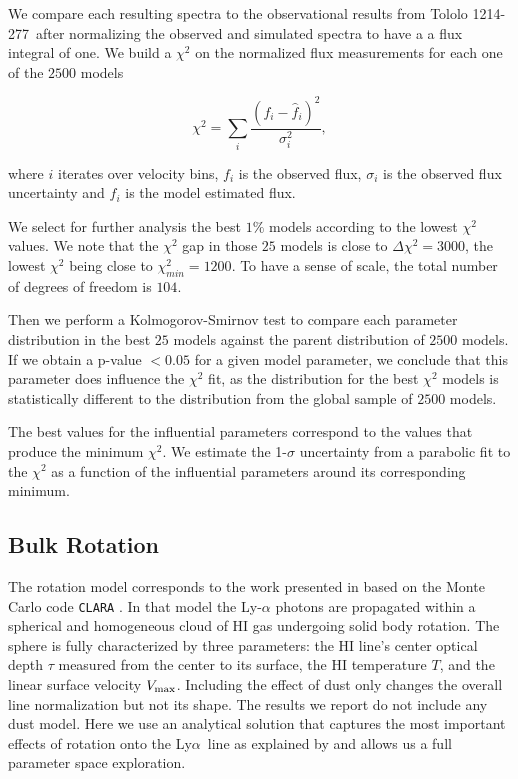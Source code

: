 \documentclass[a4,useAMS,usenatbib,usegraphicx]{mn2e}
\newcommand{\tol}{Tololo 1214-277}
\newcommand{\lya}{Ly$\alpha$}
\begin{document}
We compare each resulting spectra to the observational results from
\tol\ after normalizing the observed and simulated spectra to have a a
flux integral of one.
We build a $\chi^2$ on the normalized flux measurements for each one
of the $2500$ models

\begin{equation}
\chi^2 = \sum_{i} \frac{({f}_i - \hat{f}_i)^2}{\sigma_i^2}, 
\label{eq:chi2}
\end{equation}

where $i$ iterates over velocity bins, $f_{i}$ is the observed flux,
$\sigma_i$ is the observed flux uncertainty and $\hat{f}_i$ is the
model estimated flux.
 
We select for further analysis the best $1\%$ models according to the
lowest $\chi^2$ values.
We note that the $\chi^2$ gap in those $25$ models is close to
$\Delta\chi^2 = 3000$, the lowest $\chi^2$ being close to
$\chi^2_{min}=1200$.
To have a sense of scale, the total number of degrees of freedom is
$104$. 

Then we perform a Kolmogorov-Smirnov test to compare each parameter
distribution in the best $25$ models against the parent distribution
of $2500$ models. 
If we obtain a p-value $<0.05$ for a given model parameter, we conclude that
this parameter does influence the $\chi^2$ fit, as the distribution for
the best $\chi^2$ models is statistically different to the
distribution from the global sample of $2500$ models.  

The best values for the influential parameters correspond to
the values that produce the minimum
$\chi^2$.
We estimate the 1-$\sigma$ uncertainty from a parabolic fit to the
$\chi^2$ as a function of the influential parameters around its
corresponding minimum.   



\subsection{Bulk Rotation}

The rotation model corresponds to the work presented in
\citep{GaravitoCamargo2014} based on the Monte Carlo code
\texttt{CLARA} \citep{CLARA}. 
In that model the Ly-$\alpha$ photons are propagated 
within a spherical and homogeneous cloud of HI gas undergoing solid
body rotation.
The sphere is fully characterized by three parameters: the HI line's
center optical  depth $\tau$ measured from the center to its surface, the HI
temperature $T$, and the linear surface velocity $V_{\rm max}$.  
Including the effect of dust only changes the overall line
normalization but not its shape.  
The results we report do not include any dust model.
Here we use an analytical solution that captures the most important
effects of rotation onto the \lya\ line as explained by
\citet{GaravitoCamargo2014} and allows us a full parameter space
exploration.  
\end{document}
